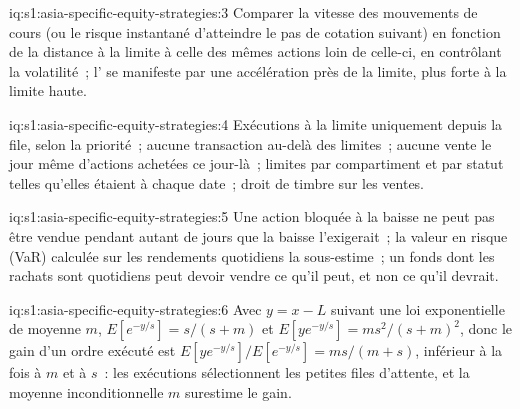 \begin{solution}{iq:s1:asia-specific-equity-strategies:3}
Comparer la vitesse des mouvements de cours (ou le risque instantané d'atteindre le pas de cotation suivant) en fonction de la distance à la limite à celle des mêmes actions loin
de celle-ci, en contrôlant la volatilité~; l' se manifeste par une accélération près de la limite, plus forte à la limite haute.
\end{solution}

\begin{solution}{iq:s1:asia-specific-equity-strategies:4}
Exécutions à la limite uniquement depuis la file, selon la priorité~; aucune transaction au-delà des limites~; aucune vente le jour même d'actions achetées ce jour-là~; limites par compartiment et
par statut telles qu'elles étaient à chaque date~; droit de timbre sur les ventes.
\end{solution}

\begin{solution}{iq:s1:asia-specific-equity-strategies:5}
Une action bloquée à la baisse ne peut pas être vendue pendant autant de jours que la baisse l'exigerait~; la valeur en risque (VaR) calculée sur les rendements quotidiens la sous-estime~; un fonds dont les rachats sont
quotidiens peut devoir vendre ce qu'il peut, et non ce qu'il devrait.
\end{solution}

\begin{solution}{iq:s1:asia-specific-equity-strategies:6}
Avec $y = x - L$ suivant une loi exponentielle de moyenne $m$, $E[e^{-y/s}] = s/(s + m)$ et $E[y e^{-y/s}] = m s^2/(s + m)^2$, donc le gain d'un ordre exécuté est
$E[y e^{-y/s}]/E[e^{-y/s}] = m s/(m + s)$, inférieur à la fois à $m$ et à $s$~: les exécutions sélectionnent les petites files d'attente, et la moyenne inconditionnelle $m$ surestime le gain.
\end{solution}
